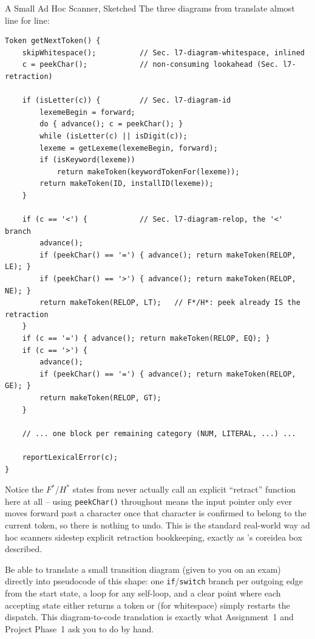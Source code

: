 \documentclass[full-course-notes.tex]{subfiles}
\begin{document}
\begin{examplebox}{A Small Ad Hoc Scanner, Sketched}
The three diagrams from  translate almost line for line:
\begin{verbatim}
Token getNextToken() {
    skipWhitespace();          // Sec. l7-diagram-whitespace, inlined
    c = peekChar();            // non-consuming lookahead (Sec. l7-retraction)

    if (isLetter(c)) {         // Sec. l7-diagram-id
        lexemeBegin = forward;
        do { advance(); c = peekChar(); }
        while (isLetter(c) || isDigit(c));
        lexeme = getLexeme(lexemeBegin, forward);
        if (isKeyword(lexeme))
            return makeToken(keywordTokenFor(lexeme));
        return makeToken(ID, installID(lexeme));
    }

    if (c == '<') {            // Sec. l7-diagram-relop, the '<' branch
        advance();
        if (peekChar() == '=') { advance(); return makeToken(RELOP, LE); }
        if (peekChar() == '>') { advance(); return makeToken(RELOP, NE); }
        return makeToken(RELOP, LT);   // F*/H*: peek already IS the retraction
    }
    if (c == '=') { advance(); return makeToken(RELOP, EQ); }
    if (c == '>') {
        advance();
        if (peekChar() == '=') { advance(); return makeToken(RELOP, GE); }
        return makeToken(RELOP, GT);
    }

    // ... one block per remaining category (NUM, LITERAL, ...) ...

    reportLexicalError(c);
}
\end{verbatim}
Notice the $F^{*}$/$H^{*}$ states from  never actually call an
explicit ``retract'' function here at all -- using \texttt{peekChar()} throughout means the
input pointer only ever moves forward past a character once that character is confirmed to
belong to the current token, so there is nothing to undo. This is the standard real-world way
ad hoc scanners sidestep explicit retraction bookkeeping, exactly as
's coreidea box described.
\end{examplebox}

\begin{examfocus}
Be able to translate a small transition diagram (given to you on an exam) directly into
pseudocode of this shape: one \texttt{if}/\texttt{switch} branch per outgoing edge from the
start state, a loop for any self-loop, and a clear point where each accepting state either
returns a token or (for whitespace) simply restarts the dispatch. This diagram-to-code
translation is exactly what Assignment~1 and Project Phase~1 ask you to do by hand.
\end{examfocus}
\end{document}
